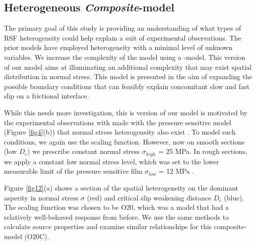 \documentclass[preprint,1p, 10pt,authoryear]{elsarticle}
\begin{document}
\subsection{Heterogeneous \textit{Composite}-model}
The primary goal of this study is providing an understanding of what types of RSF heterogeneity could help explain a suit of experimental observations. The prior models have employed heterogeneity with a minimal level of unknown variables. We increase the complexity of the model using a -model.  This version of our model aims at illuminating an additional complexity that may exist spatial distribution in normal stress. This model is presented in the aim of expanding the possible boundary conditions that can feasibly explain concomitant slow and fast slip on a frictional interface. 

While this needs more investigation, this is version of our model is motivated by the experimental observations with made with the pressure sensitive model (Figure \ref{fig4}(b)) that normal stress heterogeneity also exist \citep{Selvadurai2017}. To model such conditions, we again use the scaling function. However, now on smooth sections (low $D_{c}$) we prescribe constant normal stress $\sigma_{high}$ = 25 MPa.  In rough sections, we apply a constant low normal stress level, which was set to the lower measurable limit of the pressure sensitive film $\sigma_{low}$ = 12 MPa \citep{Selvadurai2015a}. 

Figure \ref{fig12}(a) shows a section of the spatial heterogeneity on the dominant asperity in normal stress $\sigma$ (red) and critical slip weakening distance $D_{c}$ (blue).  The scaling function was chosen to be O20, which was a model that had a relatively well-behaved response from before.  We use the same methods to calculate source properties and examine similar relationships for this composite-model (O20C).
\end{document}
